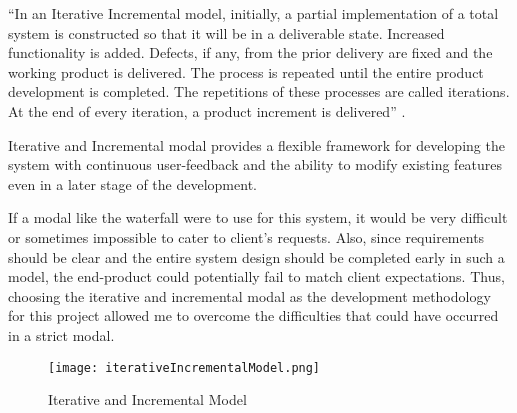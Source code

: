\documentclass[12pt]{report}
\begin{document}
``In an Iterative Incremental model, initially, a partial implementation of a total system is constructed so that it will be in a deliverable state. Increased functionality is added. Defects, if any, from the prior delivery are fixed and the working product is delivered. The process is repeated until the entire product development is completed. The repetitions of these processes are called iterations. At the end of every iteration, a product increment is delivered'' \cite{tpoint_2019_iterative_incremental}.

Iterative and Incremental modal provides a flexible framework for developing the system with continuous user-feedback and the ability to modify existing features even in a later stage of the development.

If a modal like the waterfall were to use for this system, it would be very difficult or sometimes impossible to cater to client's requests. Also, since requirements should be clear and the entire system design should be completed early in such a model, the end-product could potentially fail to match client expectations. Thus, choosing the iterative and incremental modal as the development methodology for this project allowed me to overcome the difficulties that could have occurred in a strict modal.


\begin{figure}[H]
	\centering
	\texttt{[image: iterativeIncrementalModel.png]}
	\caption{Iterative and Incremental Model}
	\label{fig:iterativeIncrementalModel}
\end{figure}
\end{document}
